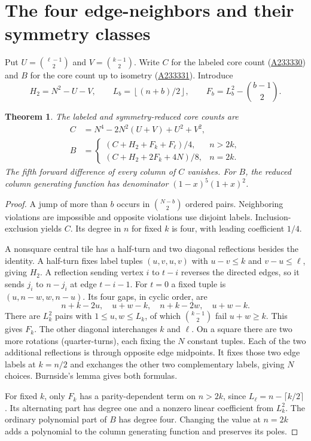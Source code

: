 \documentclass[11pt,letterpaper]{article}
\newtheorem{theorem}{Theorem}[section]
\newcommand{\floor}[1]{\left\lfloor #1\right\rfloor}
\newcommand{\oid}[1]{\href{https://oeis.org/A#1}{A#1}}
\newcommand{\cc}[2]{\binom{#1}{#2}}
\begin{document}
\section{The four edge-neighbors and their symmetry classes}
Put $U=\binom{\ell-1}{2}$ and $V=\binom{k-1}{2}$. Write $C$ for the labeled core count (\oid{233330}) and $B$ for the core count up to isometry (\oid{233331}). Introduce
\[
 H_2=N^2-U-V,\qquad L_b=\floor{(n+b)/2},\qquad F_b=L_b^2-\cc{b-1}{2}.
\]
\begin{theorem}\label{th:core}
The labeled and symmetry-reduced core counts are
\begin{align*}
 C&=N^4-2N^2(U+V)+U^2+V^2,\\
 B&=\begin{cases}
 (C+H_2+F_k+F_\ell)/4,& n>2k,\\
 (C+H_2+2F_k+4N)/8,& n=2k .
 \end{cases}
\end{align*}
The fifth forward difference of every column of $C$ vanishes. For $B$, the reduced column generating function has denominator $(1-x)^5(1+x)^2$.
\end{theorem}
\begin{proof}
A jump of more than $b$ occurs in $\binom{N-b}{2}$ ordered pairs. Neighboring violations are impossible and opposite violations use disjoint labels. Inclusion-exclusion yields $C$. Its degree in $n$ for fixed $k$ is four, with leading coefficient $1/4$.

A nonsquare central tile has a half-turn and two diagonal reflections besides the identity. A half-turn fixes label tuples $(u,v,u,v)$ with $u-v\le k$ and $v-u\le\ell$, giving $H_2$. A reflection sending vertex $i$ to $t-i$ reverses the directed edges, so it sends $j_i$ to $n-j_i$ at edge $t-i-1$. For $t=0$ a fixed tuple is $(u,n-w,w,n-u)$. Its four gaps, in cyclic order, are
\[
 n+k-2u,\quad u+w-k,\quad n+k-2w,\quad u+w-k.
\]
There are $L_k^2$ pairs with $1\le u,w\le L_k$, of which $\binom{k-1}{2}$ fail $u+w\ge k$. This gives $F_k$. The other diagonal interchanges $k$ and $\ell$. On a square there are two more rotations (quarter-turns), each fixing the $N$ constant tuples. Each of the two additional reflections is through opposite edge midpoints. It fixes those two edge labels at $k=n/2$ and exchanges the other two complementary labels, giving $N$ choices. Burnside's lemma gives both formulas.

For fixed $k$, only $F_k$ has a parity-dependent term on $n>2k$, since $L_\ell=n-\lceil k/2\rceil$. Its alternating part has degree one and a nonzero linear coefficient from $L_k^2$. The ordinary polynomial part of $B$ has degree four. Changing the value at $n=2k$ adds a polynomial to the column generating function and preserves its poles.
\end{proof}
\end{document}
